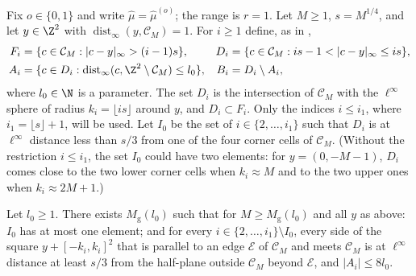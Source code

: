 Fix $o \in \{0, 1\}$ and write $\hat\mu = \hat\mu^{(o)}$; the range is $r = 1$. Let $M \ge 1$, $s = M^{1/4}$, and let $y \in \Z^2$ with $\operatorname{dist}_\infty(y, \mathcal C_M) = 1$. For $i \ge 1$ define, as in \cite[p.~39]{MOS94},
\begin{equation}\label{e:shells}
\begin{aligned}
F_i &= \{ c \in \mathcal C_M : |c - y|_\infty > (i - 1) s \}, & D_i &= \{ c \in \mathcal C_M : i s - 1 < |c - y|_\infty \le i s \}, \\
A_i &= \{ c \in D_i : \operatorname{dist}_\infty(c, \Z^2 \setminus \mathcal C_M) \le l_0 \}, & B_i &= D_i \setminus A_i ,
\end{aligned}
\end{equation}
where $l_0 \in \N$ is a parameter. The set $D_i$ is the intersection of $\mathcal C_M$ with the $\ell^\infty$ sphere of radius $k_i = \lfloor i s \rfloor$ around $y$, and $D_i \subset F_i$. Only the indices $i \le i_1$, where $i_1 = \lfloor s \rfloor + 1$, will be used. Let $I_0$ be the set of $i \in \{2, \dots, i_1\}$ such that $D_i$ is at $\ell^\infty$ distance less than $s/3$ from one of the four corner cells of $\mathcal C_M$. (Without the restriction $i \le i_1$, the set $I_0$ could have two elements: for $y = (0, -M - 1)$, $D_i$ comes close to the two lower corner cells when $k_i \approx M$ and to the two upper ones when $k_i \approx 2M + 1$.)

\begin{lemma}\label{l:shellgeom}
Let $l_0 \ge 1$. There exists $M_{\mathrm g}(l_0)$ such that for $M \ge M_{\mathrm g}(l_0)$ and all $y$ as above: $I_0$ has at most one element; and for every $i \in \{2, \dots, i_1\} \setminus I_0$, every side of the square $y + [-k_i, k_i]^2$ that is parallel to an edge $\mathcal E$ of $\mathcal C_M$ and meets $\mathcal C_M$ is at $\ell^\infty$ distance at least $s/3$ from the half-plane outside $\mathcal C_M$ beyond $\mathcal E$, and $|A_i| \le 8 l_0$.
\end{lemma}

